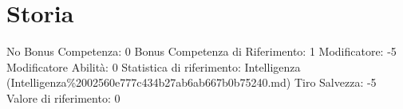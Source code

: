 \section{Storia}\label{storia}

\begin{description}
\tightlist
\item[Tags: ABI]
No Bonus Competenza: 0 Bonus Competenza di Riferimento: 1 Modificatore:
-5 Modificatore Abilità: 0 Statistica di riferimento: Intelligenza
(Intelligenza\%2002560e777c434b27ab6ab667b0b75240.md) Tiro Salvezza: -5
Valore di riferimento: 0
\end{description}
